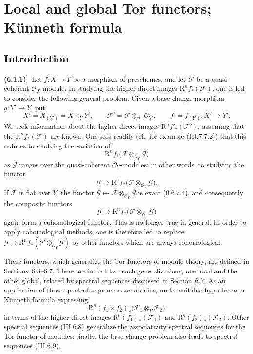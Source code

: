 \documentclass[10pt,oneside]{book}
\newcommand{\sh}[1]{\mathscr{#1}}
\newcommand{\RR}{\mathrm R}
\newcommand{\sref}[2][]{(#2)}
\newcommand{\oldpage}[2][]{\setcounter{footnote}{0}\marginpar{\scriptsize\textbf{#1}~|~#2}\ignorespaces}
\newenvironment{env}[1][]{\par\medskip\noindent\textbf{(#1)}\ }{\par}
\begin{document}
\setcounter{section}{5}
\setcounter{subsection}{0}
\setcounter{equation}{0}
\setcounter{footnote}{0}
\section{Local and global Tor functors; K\"unneth formula}
\label{section:III.6}


\subsection{Introduction}
\label{subsection:III.6.1}

\oldpage[III]{137}

\begin{env}[6.1.1]
\label{III.6.1.1}
Let $f:X\to Y$ be a morphism of preschemes, and let $\sh{F}$ be
a quasi-coherent $\sh{O}_X$-module.  In studying the higher direct
images $\RR^n f_*(\sh{F})$, one is led to consider the following
general problem.  Given a base-change morphism $g:Y'\to Y$, put
\[
  X'=X_{(Y')}=X\times_Y Y',\qquad
  \sh{F}'=\sh{F}\otimes_{\sh{O}_Y}\sh{O}_{Y'},\qquad
  f'=f_{(Y')}:X'\to Y'.
\]
We seek information about the higher direct images
$\RR^n f'_*(\sh{F}')$, assuming that the
$\RR^n f_*(\sh{F})$ are known.  One sees readily
(cf.\ for example \sref{III.7.7.2}) that this reduces to studying
the variation of
\[
  \RR^n f_*\bigl(\sh{F}\otimes_{\sh{O}_Y}\sh{G}\bigr)
\]
as $\sh{G}$ ranges over the quasi-coherent $\sh{O}_Y$-modules;
in other words, to studying the functor
\[
  \sh{G}\longmapsto
  \RR^n f_*\bigl(\sh{F}\otimes_{\sh{O}_Y}\sh{G}\bigr).
\]
If $\sh{F}$ is flat over $Y$, the functor
$\sh{G}\mapsto\sh{F}\otimes_{\sh{O}_Y}\sh{G}$ is exact
\sref[0]{0.6.7.4}, and consequently the composite functors
\[
  \sh{G}\longmapsto
  \RR^n f_*\bigl(\sh{F}\otimes_{\sh{O}_Y}\sh{G}\bigr)
\]
again form a cohomological functor.  This is no longer true in
general.  In order to apply cohomological methods, one is therefore
led to replace
$\sh{G}\mapsto
\RR^n f_*(\sh{F}\otimes_{\sh{O}_Y}\sh{G})$
by other functors which are always cohomological.

These functors, which generalize the Tor functors of module theory,
are defined in Sections~\hyperref[subsection:III.6.3]{6.3}--\hyperref[subsection:III.6.7]{6.7}.  There are in fact two such
generalizations, one local and the other global, related by spectral
sequences discussed in Section~\hyperref[subsection:III.6.7]{6.7}.  As an application of those
spectral sequences one obtains, under suitable hypotheses, a
K\"unneth formula expressing
\[
  \RR^n(f_1\times f_2)_*
  \bigl(\sh{F}_1\otimes_Y\sh{F}_2\bigr)
\]
in terms of the higher direct images
$\RR^p(f_1)_*(\sh{F}_1)$ and
$\RR^q(f_2)_*(\sh{F}_2)$.  Other spectral sequences
\sref{III.6.8} generalize the associativity spectral sequences for
the Tor functor of modules; finally, the base-change problem also
leads to spectral sequences \sref{III.6.9}.
\end{env}
\end{document}
